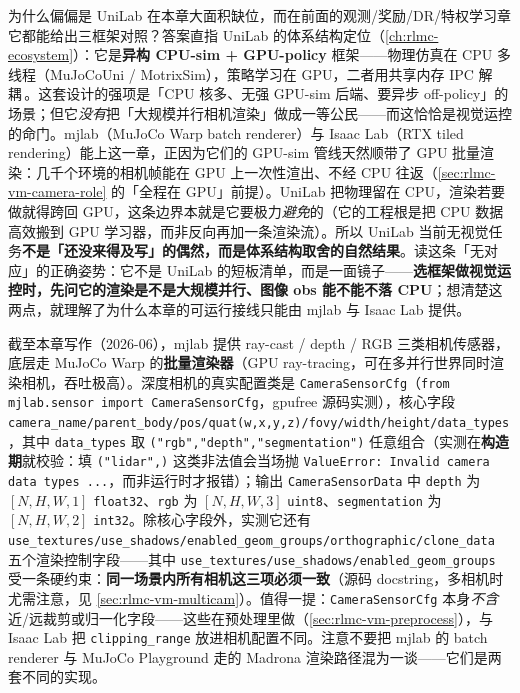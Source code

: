 \begin{insight}\label{ins:rlmc-vm-unilab-gap}
为什么偏偏是 UniLab 在本章大面积缺位，而在前面的观测/奖励/DR/特权学习章它都能给出三框架对照？答案直指 UniLab 的体系结构定位（\cref{ch:rlmc-ecosystem}）：它是\textbf{异构 CPU-sim + GPU-policy} 框架——物理仿真在 CPU 多线程（MuJoCoUni / MotrixSim），策略学习在 GPU，二者用共享内存 IPC 解耦\,\cite{unilab2026}。这套设计的强项是「CPU 核多、无强 GPU-sim 后端、要异步 off-policy」的场景；但它\emph{没有}把「大规模并行相机渲染」做成一等公民——而这恰恰是视觉运控的命门。mjlab（MuJoCo Warp batch renderer）与 Isaac Lab（RTX tiled rendering）能上这一章，正因为它们的 GPU-sim 管线天然顺带了 GPU 批量渲染：几千个环境的相机帧能在 GPU 上一次性渲出、不经 CPU 往返（\cref{sec:rlmc-vm-camera-role} 的「全程在 GPU」前提）。UniLab 把物理留在 CPU，渲染若要做就得跨回 GPU，这条边界本就是它要极力\emph{避免}的（它的工程根是把 CPU 数据高效搬到 GPU 学习器，而非反向再加一条渲染流）。所以 UniLab 当前无视觉任务\textbf{不是「还没来得及写」的偶然，而是体系结构取舍的自然结果}。读这条「无对应」的正确姿势：它不是 UniLab 的短板清单，而是一面镜子——\textbf{选框架做视觉运控时，先问它的渲染是不是大规模并行、图像 obs 能不能不落 CPU}；想清楚这两点，就理解了为什么本章的可运行接线只能由 mjlab 与 Isaac Lab 提供。
\end{insight}

\begin{note}
截至本章写作（2026-06），mjlab 提供 ray-cast / depth / RGB 三类相机传感器，底层走 MuJoCo Warp 的\textbf{批量渲染器}（GPU ray-tracing，可在多并行世界同时渲染相机，吞吐极高）。深度相机的真实配置类是 \texttt{CameraSensorCfg}（\verb|from mjlab.sensor import CameraSensorCfg|，gpufree 源码实测），核心字段 \verb|camera_name/parent_body/pos/quat(w,x,y,z)/fovy/width/height/data_types|，其中 \verb|data_types| 取 \verb|("rgb","depth","segmentation")| 任意组合（实测在\textbf{构造期}就校验：填 \verb|("lidar",)| 这类非法值会当场抛 \verb|ValueError: Invalid camera data types ...|，而非运行时才报错）；输出 \texttt{CameraSensorData} 中 \verb|depth| 为 $[N,H,W,1]$ \verb|float32|、\verb|rgb| 为 $[N,H,W,3]$ \verb|uint8|、\verb|segmentation| 为 $[N,H,W,2]$ \verb|int32|。除核心字段外，实测它还有 \verb|use_textures/use_shadows/enabled_geom_groups/orthographic/clone_data| 五个渲染控制字段——其中 \verb|use_textures/use_shadows/enabled_geom_groups| 受一条硬约束：\textbf{同一场景内所有相机这三项必须一致}（源码 docstring，多相机时尤需注意，见 \cref{sec:rlmc-vm-multicam}）。值得一提：\texttt{CameraSensorCfg} 本身\emph{不含}近/远裁剪或归一化字段——这些在预处理里做（\cref{sec:rlmc-vm-preprocess}），与 Isaac Lab 把 \texttt{clipping\_range} 放进相机配置不同。注意不要把 mjlab 的 batch renderer 与 MuJoCo Playground 走的 Madrona 渲染路径混为一谈——它们是两套不同的实现。
\end{note}

